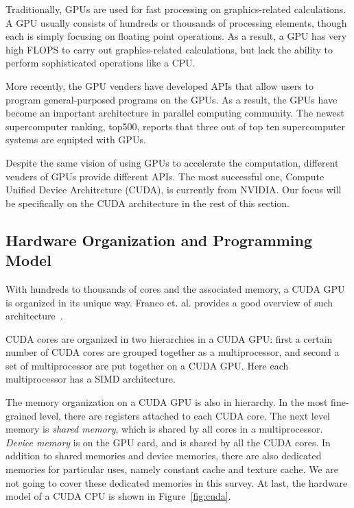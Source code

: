 Traditionally, GPUs are used for fast processing on 
graphics-related calculations.
%
A GPU usually consists of hundreds or thousands of processing elements,
though each is simply focusing on floating point operations. 
%
As a result, a GPU has very high FLOPS to carry out graphics-related
calculations, but lack the ability to 
perform sophisticated operations like a CPU.


More recently, the GPU venders have developed APIs that allow users
to program general-purposed programs on the GPUs. 
%
As a result, the GPUs have become an important architecture in 
parallel computing community.
%
The newest supercomputer ranking, top500, reports that three out of 
top ten supercomputer systems are equipted with GPUs.


Despite the same vision of using GPUs to accelerate the computation,
different venders of GPUs provide different APIs. 
%
The most successful one, Compute Unified Device Architrcture (CUDA), 
is currently from NVIDIA.
%
Our focus will be specifically on the CUDA architecture in the rest 
of this section.


\subsection{Hardware Organization and Programming Model}
%
With hundreds to thousands of cores and the associated memory, 
a CUDA GPU is organized in its unique way. 
%
Franco et. al. provides a good overview of such 
architecture~\cite{franco2009parallel}.


CUDA cores are organized in two hierarchies in a CUDA GPU:
first a certain number of CUDA cores are grouped together as a multiprocessor,
and second a set of multiprocessor are put together on a CUDA GPU.
%
Here each multiprocessor has a SIMD architecture.


The memory organization on a CUDA GPU is also in hierarchy.
%
In the most fine-grained level, there are registers attached to each CUDA core.
%
The next level memory is \textit{shared memory}, which is shared by all cores
in a multiprocessor.
%
\textit{Device memory} is on the GPU card, and is shared by all the CUDA cores.
%
In addition to shared memories and device memories, there are also dedicated 
memories for particular uses, namely constant cache and texture cache.
%
We are not going to cover these dedicated memories in this survey.
%
At last, the hardware model of a CUDA CPU is shown in Figure~\ref{fig:cuda}.
